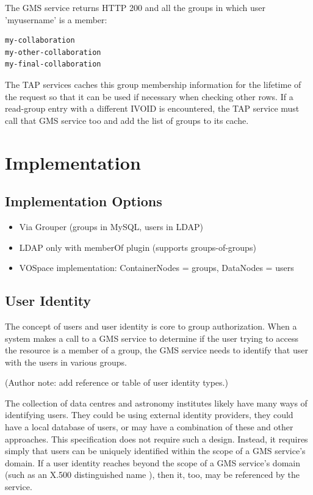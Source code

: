 \documentclass[11pt,a4paper]{ivoa}
\begin{document}
The GMS service returns HTTP 200 and all the groups in which user 'myusername' is a member:

\begin{verbatim}
my-collaboration
my-other-collaboration
my-final-collaboration
\end{verbatim}

The TAP services caches this group membership information for the lifetime of the request so that it can be used if necessary when checking other rows.  If a read-group entry with a different IVOID is encountered, the TAP service must call that GMS service too and add the list of groups to its cache.

\section {Implementation}

\subsection {Implementation Options}

\begin{itemize}
\item Via Grouper (groups in MySQL, users in LDAP)
\item LDAP only with memberOf plugin (supports groups-of-groups)
\item VOSpace implementation: ContainerNodes = groups, DataNodes = users
\end{itemize}

\subsection{User Identity}

The concept of users and user identity is core to group authorization.  When a system makes a call to a GMS service to determine if the user trying to access the resource is a member of a group, the GMS service needs to identify that user with the users in various groups.

(Author note: add reference or table of user identity types.)

The collection of data centres and astronomy institutes likely have many ways of identifying users.  They could be using external identity providers, they could have a local database of users, or may have a combination of these and other approaches.  This specification does not require such a design.  Instead, it requires simply that users can be uniquely identified within the scope of a GMS service's domain.  If a user identity reaches beyond the scope of a GMS service's domain (such as an X.500 distinguished name \citep{std:RFC1779}), then it, too, may be referenced by the service.
\end{document}
